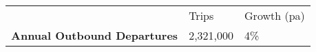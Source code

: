\begin{tabular}[t]{p{4.7cm}>{\hfill}p{1.1cm}>{\hfill}p{1.7cm}}
   & Trips & Growth (pa) \\ 
 \textbf{Annual Outbound Departures} & 2,321,000 & 4\% \\ 
  \end{tabular}
